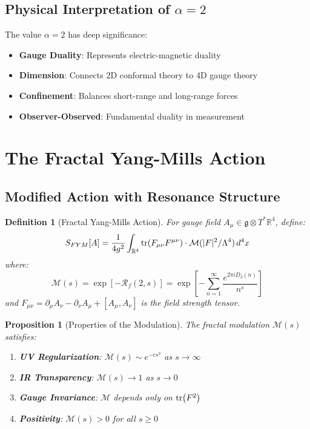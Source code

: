 \documentclass[12pt]{article}
\newcommand{\R}{\mathbb{R}}
\newcommand{\fractalres}{\mathcal{R}_f}
\newcommand{\digitalsum}{D_3}
\newtheorem{proposition}[theorem]{Proposition}
\newtheorem{definition}[theorem]{Definition}
\begin{document}
\subsection{Physical Interpretation of $\alpha = 2$}

The value $\alpha = 2$ has deep significance:
\begin{itemize}
\item \textbf{Gauge Duality}: Represents electric-magnetic duality
\item \textbf{Dimension}: Connects 2D conformal theory to 4D gauge theory
\item \textbf{Confinement}: Balances short-range and long-range forces
\item \textbf{Observer-Observed}: Fundamental duality in measurement
\end{itemize}

\section{The Fractal Yang-Mills Action}

\subsection{Modified Action with Resonance Structure}

\begin{definition}[Fractal Yang-Mills Action]
\label{def:fractal_ym_action}
For gauge field $A_\mu \in \mathfrak{g} \otimes T^*\R^4$, define:
\begin{equation}
S_{FYM}[A] = \frac{1}{4g^2} \int_{\R^4} \tr(F_{\mu\nu}F^{\mu\nu}) \cdot \mathcal{M}(|F|^2/\Lambda^4) \, d^4x
\end{equation}
where:
\begin{equation}
\mathcal{M}(s) = \exp[-\fractalres(2, s)] = \exp\left[-\sum_{n=1}^{\infty} \frac{e^{2\pi i \digitalsum(n)}}{n^s}\right]
\end{equation}
and $F_{\mu\nu} = \partial_\mu A_\nu - \partial_\nu A_\mu + [A_\mu, A_\nu]$ is the field strength tensor.
\end{definition}

\begin{proposition}[Properties of the Modulation]
\label{prop:modulation}
The fractal modulation $\mathcal{M}(s)$ satisfies:
\begin{enumerate}
\item \textbf{UV Regularization}: $\mathcal{M}(s) \sim e^{-cs^2}$ as $s \to \infty$
\item \textbf{IR Transparency}: $\mathcal{M}(s) \to 1$ as $s \to 0$
\item \textbf{Gauge Invariance}: $\mathcal{M}$ depends only on $\tr(F^2)$
\item \textbf{Positivity}: $\mathcal{M}(s) > 0$ for all $s \geq 0$
\end{enumerate}
\end{proposition}
\end{document}
